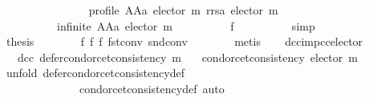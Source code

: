 \begin{isabellebody}
\ \ \ \ \ \ \isamarkupfalse%
\isanewline
\ \ \ \ \ \ \ \ {\isachardoublequoteopen}{\isasymnot}\ profile\ {\isacharparenleft}{\kern0pt}AAa\ {\isacharparenleft}{\kern0pt}elector\ m{\isacharparenright}{\kern0pt}{\isacharparenright}{\kern0pt}\ {\isacharparenleft}{\kern0pt}rrsa\ {\isacharparenleft}{\kern0pt}elector\ m{\isacharparenright}{\kern0pt}{\isacharparenright}{\kern0pt}\ {\isasymor}\isanewline
\ \ \ \ \ \ \ \ \ \ infinite\ {\isacharparenleft}{\kern0pt}AAa\ {\isacharparenleft}{\kern0pt}elector\ m{\isacharparenright}{\kern0pt}{\isacharparenright}{\kern0pt}{\isachardoublequoteclose}\isanewline
\ \ \ \ \ \ \ \ \isamarkupfalse%
\ f{}\isanewline
\ \ \ \ \ \ \ \ \isamarkupfalse%
\ simp\isanewline
\ \ \ \ \isacommand{{\isacharbraceright}{\kern0pt}}\isamarkupfalse%
\isanewline
\ \ \ \ \isamarkupfalse%
\ \isamarkupfalse%
\ {\isacharquery}{\kern0pt}thesis\isanewline
\ \ \ \ \ \ \isamarkupfalse%
\ f{}\ f{}\ f{}\ fst{\isacharunderscore}{\kern0pt}conv\ snd{\isacharunderscore}{\kern0pt}conv\isanewline
\ \ \ \ \ \ \isamarkupfalse%
\ metis\isanewline
\ \ \isamarkupfalse%
\isanewline
{}\isamarkupfalse%
%
\endisatagproof
{\isafoldproof}%
%
\isadelimproof
%
\endisadelimproof
%
\isadelimdocument
%
\endisadelimdocument
%
\isatagdocument
%
\isamarkuptrue%
%
\endisatagdocument
{\isafolddocument}%
%
\isadelimdocument
%
\endisadelimdocument
{}\isamarkupfalse%
\ dcc{\isacharunderscore}{\kern0pt}imp{\isacharunderscore}{\kern0pt}cc{\isacharunderscore}{\kern0pt}elector{\isacharcolon}{\kern0pt}\isanewline
\ \ \ dcc{\isacharcolon}{\kern0pt}\ {\isachardoublequoteopen}defer{\isacharunderscore}{\kern0pt}condorcet{\isacharunderscore}{\kern0pt}consistency\ m{\isachardoublequoteclose}\isanewline
\ \ \ {\isachardoublequoteopen}condorcet{\isacharunderscore}{\kern0pt}consistency\ {\isacharparenleft}{\kern0pt}elector\ m{\isacharparenright}{\kern0pt}{\isachardoublequoteclose}\isanewline
%
\isadelimproof
%
\endisadelimproof
%
\isatagproof
{}\isamarkupfalse%
\ {\isacharparenleft}{\kern0pt}unfold\ defer{\isacharunderscore}{\kern0pt}condorcet{\isacharunderscore}{\kern0pt}consistency{\isacharunderscore}{\kern0pt}def\isanewline
\ \ \ \ \ \ \ \ \ \ \ \ \ \ condorcet{\isacharunderscore}{\kern0pt}consistency{\isacharunderscore}{\kern0pt}def{\isacharcomma}{\kern0pt}\ auto{\isacharparenright}{\kern0pt}\isanewline

\end{isabellebody}
